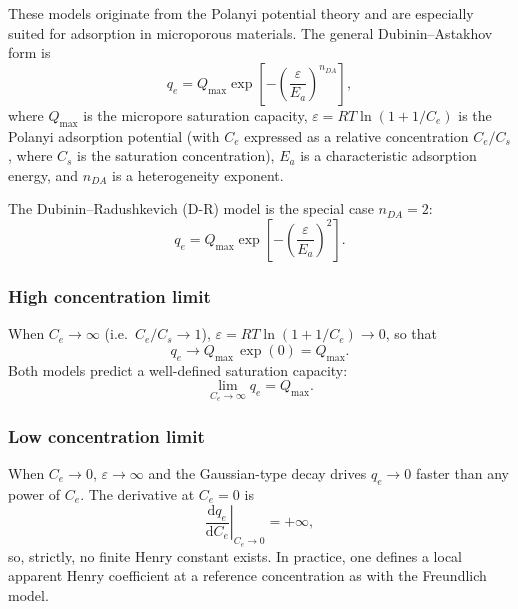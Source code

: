 \documentclass[12pt]{article}
\begin{document}
	These models originate from the Polanyi potential theory and are
	especially suited for adsorption in microporous materials. The
	general Dubinin--Astakhov form is
	\begin{equation}
		q_e = Q_{\max} \exp\!\left[
		-\left(\frac{\varepsilon}{E_a}\right)^{\!n_{DA}}
		\right],
		\label{eq:DA}
	\end{equation}
	where $Q_{\max}$ is the micropore saturation capacity,
	$\varepsilon = RT\ln(1 + 1/C_e)$ is the Polanyi adsorption
	potential (with $C_e$ expressed as a relative concentration
	$C_e/C_s$, where $C_s$ is the saturation concentration),
	$E_a$ is a characteristic adsorption energy, and $n_{DA}$ is
	a heterogeneity exponent.

	The Dubinin--Radushkevich (D-R) model is the special case $n_{DA} = 2$:
	\begin{equation}
		q_e = Q_{\max} \exp\!\left[
		-\left(\frac{\varepsilon}{E_a}\right)^{\!2}
		\right].
		\label{eq:DR}
	\end{equation}

	\subsubsection{High concentration limit}

	When $C_e \to \infty$ (i.e.\ $C_e/C_s \to 1$),
	$\varepsilon = RT\ln(1 + 1/C_e) \to 0$, so that
	\begin{equation}
		q_e \to Q_{\max}\,\exp(0) = Q_{\max}.
	\end{equation}
	Both models predict a well-defined saturation capacity:
	\begin{equation}
		\boxed{\lim_{C_e \to \infty} q_e = Q_{\max}.}
	\end{equation}

	\subsubsection{Low concentration limit}

	When $C_e \to 0$, $\varepsilon \to \infty$ and the Gaussian-type
	decay drives $q_e \to 0$ faster than any power of $C_e$. The
	derivative at $C_e = 0$ is
	\begin{equation}
		\left.\frac{\mathrm{d}q_e}{\mathrm{d}C_e}\right|_{C_e \to 0}
		= +\infty,
	\end{equation}
	so, strictly, no finite Henry constant exists. In practice, one
	defines a local apparent Henry coefficient at a reference
	concentration as with the Freundlich model.
\end{document}

